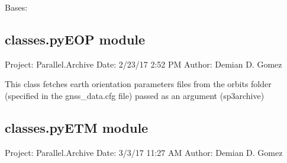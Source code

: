 \documentclass[letterpaper,10pt,english]{sphinxmanual}
\begin{document}

\begin{fulllineitems}
\label{\detokenize{classes:classes.pyDate.pyDateException}}
\pysigstartsignatures
{}
\pysigstopsignatures
\sphinxAtStartPar
Bases: 

\end{fulllineitems}


\begin{fulllineitems}
\label{\detokenize{classes:classes.pyDate.yeardoy2fyear}}
\pysigstartsignatures
{}
\pysigstopsignatures
\end{fulllineitems}



\subsection{classes.pyEOP module}
\label{\detokenize{classes:module-classes.pyEOP}}\label{\detokenize{classes:classes-pyeop-module}}
\sphinxAtStartPar
Project: Parallel.Archive
Date: 2/23/17 2:52 PM
Author: Demian D. Gomez

\sphinxAtStartPar
This class fetches earth orientation parameters files from the orbits folder (specified in the gnss\_data.cfg file) passed as an argument (sp3archive)


\subsection{classes.pyETM module}
\label{\detokenize{classes:module-classes.pyETM}}\label{\detokenize{classes:classes-pyetm-module}}
\sphinxAtStartPar
Project: Parallel.Archive
Date: 3/3/17 11:27 AM
Author: Demian D. Gomez
\end{document}
